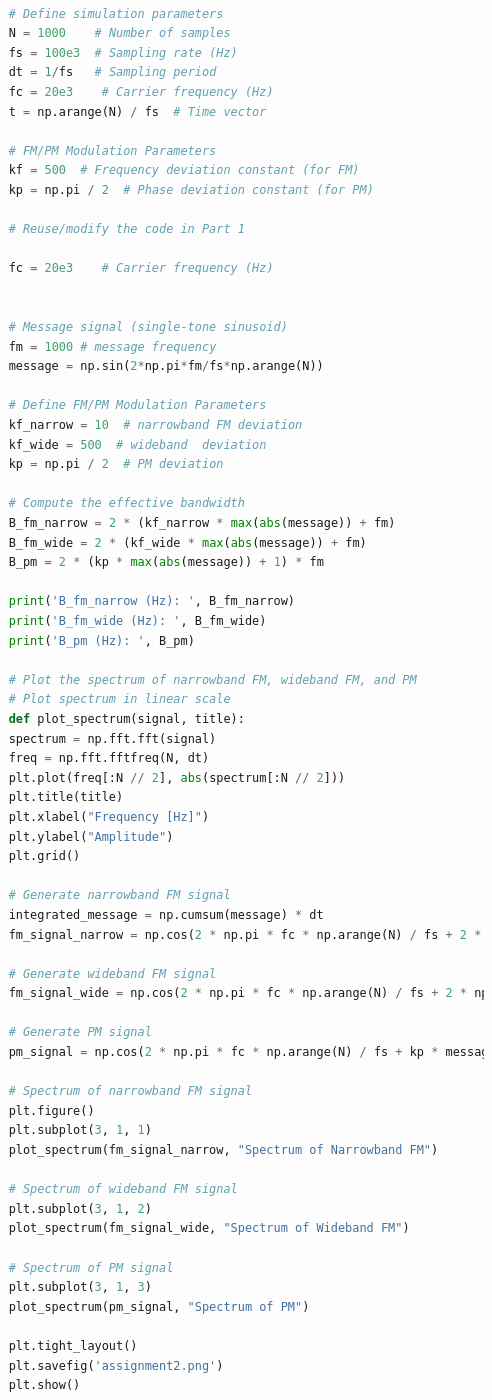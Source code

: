 \documentclass[
	letterpaper, %
	10pt, %
]{CSUniSchoolLabReport}
\begin{document}
\begin{lstlisting}[language=Python]
	
	# Define simulation parameters
	N = 1000    # Number of samples
	fs = 100e3  # Sampling rate (Hz)
	dt = 1/fs   # Sampling period
	fc = 20e3    # Carrier frequency (Hz)
	t = np.arange(N) / fs  # Time vector
	
	# FM/PM Modulation Parameters
	kf = 500  # Frequency deviation constant (for FM)
	kp = np.pi / 2  # Phase deviation constant (for PM)
	
	# Reuse/modify the code in Part 1
	
	fc = 20e3    # Carrier frequency (Hz)
	
	
	# Message signal (single-tone sinusoid)
	fm = 1000 # message frequency
	message = np.sin(2*np.pi*fm/fs*np.arange(N))
	
	# Define FM/PM Modulation Parameters
	kf_narrow = 10  # narrowband FM deviation 
	kf_wide = 500  # wideband  deviation 
	kp = np.pi / 2  # PM deviation 
	
	# Compute the effective bandwidth
	B_fm_narrow = 2 * (kf_narrow * max(abs(message)) + fm)
	B_fm_wide = 2 * (kf_wide * max(abs(message)) + fm)
	B_pm = 2 * (kp * max(abs(message)) + 1) * fm
	
	print('B_fm_narrow (Hz): ', B_fm_narrow)
	print('B_fm_wide (Hz): ', B_fm_wide)
	print('B_pm (Hz): ', B_pm)
	
	# Plot the spectrum of narrowband FM, wideband FM, and PM
	# Plot spectrum in linear scale
	def plot_spectrum(signal, title):
	spectrum = np.fft.fft(signal)
	freq = np.fft.fftfreq(N, dt)
	plt.plot(freq[:N // 2], abs(spectrum[:N // 2]))
	plt.title(title)
	plt.xlabel("Frequency [Hz]")
	plt.ylabel("Amplitude")
	plt.grid()
	
	# Generate narrowband FM signal
	integrated_message = np.cumsum(message) * dt
	fm_signal_narrow = np.cos(2 * np.pi * fc * np.arange(N) / fs + 2 * np.pi * kf_narrow * integrated_message)
	
	# Generate wideband FM signal
	fm_signal_wide = np.cos(2 * np.pi * fc * np.arange(N) / fs + 2 * np.pi * kf_wide * integrated_message)
	
	# Generate PM signal
	pm_signal = np.cos(2 * np.pi * fc * np.arange(N) / fs + kp * message)
	
	# Spectrum of narrowband FM signal
	plt.figure()
	plt.subplot(3, 1, 1)
	plot_spectrum(fm_signal_narrow, "Spectrum of Narrowband FM")
	
	# Spectrum of wideband FM signal
	plt.subplot(3, 1, 2)
	plot_spectrum(fm_signal_wide, "Spectrum of Wideband FM")
	
	# Spectrum of PM signal
	plt.subplot(3, 1, 3)
	plot_spectrum(pm_signal, "Spectrum of PM")
	
	plt.tight_layout()
	plt.savefig('assignment2.png')
	plt.show()

\end{lstlisting}
\end{document}
